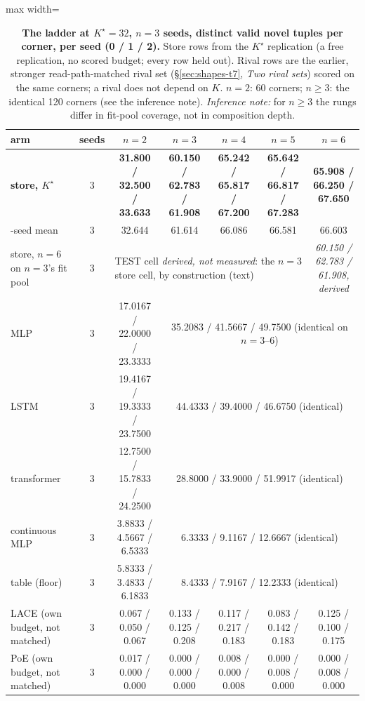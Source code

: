 \documentclass{article} %
\newcommand{\Kstar}{\ensuremath{K^{\star}}}
\begin{document}
\begin{table}[t]
\centering\small
\caption{\textbf{The ladder at $\Kstar=32$, $n=3$ seeds, distinct valid novel tuples per %
corner, per seed (0 / 1 / 2).} Store rows from the $\Kstar$ replication (a free replication,
no scored budget; every row held out). Rival rows are the earlier, stronger read-path-matched rival
set (\S\ref{sec:shapes-t7}, \emph{Two rival sets}) scored on
the same corners; a rival does not depend on $K$. $n=2$: 60 corners; $n\ge3$: the identical %
120 corners (see the inference note). \emph{Inference note:} for $n\ge3$ the rungs differ in %
fit-pool coverage, not in composition depth.}
\label{tab:ladder}
\setlength{\tabcolsep}{2.6pt}
\begin{adjustbox}{max width=\linewidth}\begin{tabular}{lcccccc}
\toprule
arm & seeds & $n=2$ & $n=3$ & $n=4$ & $n=5$ & $n=6$ \\
\midrule
\textbf{store, $\Kstar$} & 3 & \textbf{31.800 / 32.500 / 33.633} & \textbf{60.150 / 62.783 / 61.908} & \textbf{65.242 / 65.817 / 67.200} & \textbf{65.642 / 66.817 / 67.283} & \textbf{65.908 / 66.250 / 67.650} \\
\quad 3-seed mean & 3 & 32.644 & 61.614 & 66.086 & 66.581 & 66.603 \\
store, $n=6$ on $n=3$'s fit pool & 3 & \multicolumn{4}{l}{TEST cell \emph{derived, not measured}: the $n=3$ store cell, by construction (text)} & \emph{60.150 / 62.783 / 61.908, derived} \\ %
MLP & 3 & 17.0167 / 22.0000 / 23.3333 & \multicolumn{4}{c}{35.2083 / 41.5667 / 49.7500 (identical on $n=3$--$6$)} \\
LSTM & 3 & 19.4167 / 19.3333 / 23.7500 & \multicolumn{4}{c}{44.4333 / 39.4000 / 46.6750 (identical)} \\
transformer & 3 & 12.7500 / 15.7833 / 24.2500 & \multicolumn{4}{c}{28.8000 / 33.9000 / 51.9917 (identical)} \\
continuous MLP & 3 & 3.8833 / 4.5667 / 6.5333 & \multicolumn{4}{c}{6.3333 / 9.1167 / 12.6667 (identical)} \\
table (floor) & 3 & 5.8333 / 3.4833 / 6.1833 & \multicolumn{4}{c}{8.4333 / 7.9167 / 12.2333 (identical)} \\
LACE (own budget, not matched) & 3 & 0.067 / 0.050 / 0.067 & 0.133 / 0.125 / 0.208 & 0.117 / 0.217 / 0.183 & 0.083 / 0.142 / 0.183 & 0.125 / 0.100 / 0.175 \\
PoE (own budget, not matched) & 3 & 0.017 / 0.000 / 0.000 & 0.000 / 0.000 / 0.000 & 0.008 / 0.000 / 0.008 & 0.000 / 0.008 / 0.000 & 0.000 / 0.008 / 0.000 \\
\bottomrule
\end{tabular}\end{adjustbox}
\end{table}
\end{document}
